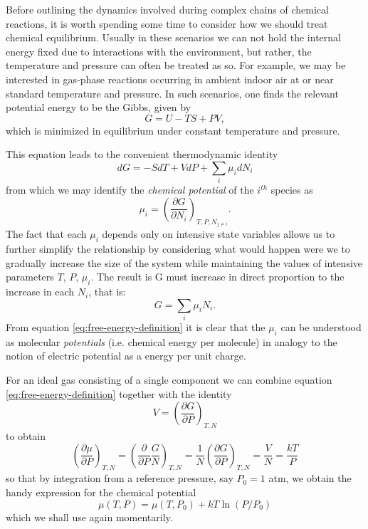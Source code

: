 Before outlining the dynamics involved during complex chains of chemical reactions, it is worth spending some time to consider how we should treat chemical equilibrium. Usually in these scenarios we can not hold the internal energy fixed due to interactions with the environment, but rather, the temperature and pressure can often be treated as so. For example, we may be interested in gas-phase reactions occurring in ambient indoor air at or near standard temperature and pressure. In such scenarios, one finds the relevant potential energy to be the Gibbs, given by
\begin{equation}
  G = U - TS + PV,
\end{equation}
which is minimized in equilibrium under constant temperature and pressure.

This equation leads to the convenient thermodynamic identity
\begin{equation}
  dG = -SdT + VdP + \sum_i \mu_i dN_i
\end{equation}
from which we may identify the \textit{chemical potential} of the $i^{th}$ species as
\begin{equation}
  \mu_i  = \left(\frac{\partial G}{\partial N_i} \right)_{T,P,N_{j\neq i}}.
\end{equation}
The fact that each $\mu_i$ depends only on intensive state variables allows us to further simplify the relationship by considering what would happen were we to gradually increase the size of the system while maintaining the values of intensive parameters $T$, $P$, $\mu_i$. The result is G must increase in direct proportion to the increase in each $N_i$, that is:
\begin{equation}
  \label{eq:free-energy-definition}
  G = \sum_i \mu_i N_i.
\end{equation}
From equation \ref{eq:free-energy-definition} it is clear that the $\mu_i$ can be understood as molecular \textit{potentials} (i.e. chemical energy per molecule) in analogy to the notion of electric potential as a energy per unit charge.


For an ideal gas consisting of a single component we can combine equation \ref{eq:free-energy-definition} together with the identity
\begin{equation}
  V = \left(\frac{\partial G}{\partial P}\right)_{T,N}
\end{equation}
to obtain
\begin{equation}
  \left(\frac{\partial \mu}{\partial P}\right)_{T,N} = \left(\frac{\partial}{\partial P}\frac{G}{N}\right)_{T,N} = \frac{1}{N}\left(\frac{\partial G}{\partial P} \right)_{T,N} = \frac{V}{N} = \frac{kT}{P}
\end{equation}
so that by integration from a reference pressure, say $P_0= 1$ atm, we obtain the handy expression for the chemical potential
\begin{equation}
  \label{eq:mu-ideal}
  \mu(T,P) = \mu(T,P_0) + kT\ln(P/P_0)
\end{equation}
which we shall use again momentarily.

